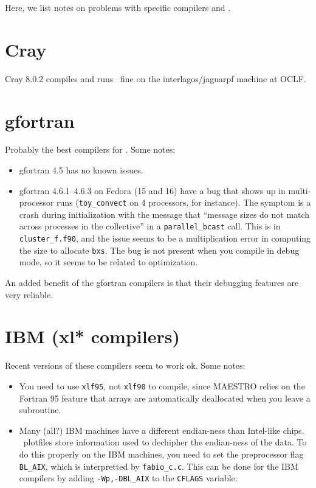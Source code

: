 Here, we list notes on problems with specific compilers and \maestro.


\section{Cray}

Cray 8.0.2 compiles and runs \maestro\ fine on the interlagos/jaguarpf 
machine at OCLF.


\section{gfortran}

Probably the best compilers for \maestro.  
Some notes:
\begin{itemize}
\item gfortran 4.5 has no known issues.
\item gfortran 4.6.1--4.6.3 on Fedora (15 and 16) have a bug that 
shows up in multi-processor runs ({\tt toy\_convect} on 4 processors, for instance).
The symptom is a crash during initialization with the message that
``message sizes do not match across processes in the collective'' in a
{\tt parallel\_bcast} call.  This is in {\tt cluster\_f.f90}, and the issue seems
to be a multiplication error in computing the size to allocate {\tt bxs}.
The bug is not present when you compile in debug mode, so it seems to be
related to optimization.
\end{itemize}

An added benefit of the gfortran compilers is that their debugging
features are very reliable.


\section{IBM (xl* compilers)}

Recent versions of these compilers seem to work ok.  Some notes:
\begin{itemize}
\item You need to use {\tt xlf95}, not {\tt xlf90} to compile, since
  MAESTRO relies on the Fortran 95 feature that arrays are
  automatically deallocated when you leave a subroutine.

\item Many (all?) IBM machines have a different endian-ness than
  Intel-like chips.  \boxlib\ plotfiles store information used to
  dechipher the endian-ness of the data.  To do this properly on
  the IBM machines, you need to set the preprocessor flag {\tt BL\_AIX},
  which is interpretted by {\tt fabio\_c.c}.  This can be done for the
  IBM compilers by adding {\tt -Wp,-DBL\_AIX} to the {\tt CFLAGS} variable.

\end{itemize}

